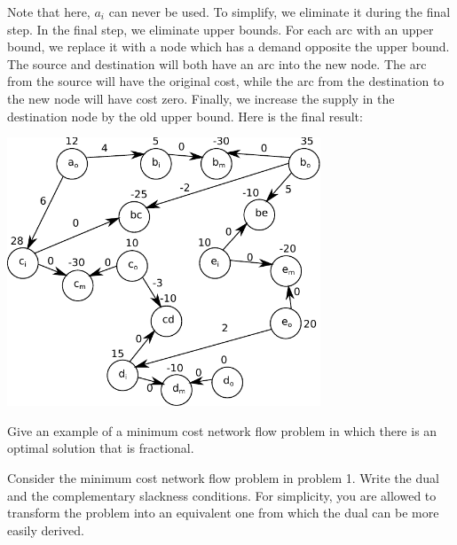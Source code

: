 \documentclass[fleqn]{homework}
\begin{document}
\begin{problem}{1}
\begin{enumerate}[a.]
      Note that here, $a_i$ can never be used.  To simplify, we eliminate it
      during the final step.  In the final step, we eliminate upper bounds.  For
      each arc with an upper bound, we replace it with a node which has a demand
      opposite the upper bound.  The source and destination will both have an
      arc into the new node.  The arc from the source will have the original
      cost, while the arc from the destination to the new node will have cost
      zero.  Finally, we increase the supply in the destination node by the old
      upper bound.  Here is the final result:

      \includegraphics[width=0.7\textwidth]{problem1-step3.pdf}
    \end{enumerate}

    
  \end{problem}

  \begin{problem}{2}
    \begin{question}
      Give an example of a minimum cost network flow problem in which there is
      an optimal solution that is fractional.
    \end{question}
  \end{problem}

  \begin{problem}{3}
    \begin{question}
      Consider the minimum cost network flow problem in problem 1.  Write the
      dual and the complementary slackness conditions.  For simplicity, you are
      allowed to transform the problem into an equivalent one from which the
      dual can be more easily derived.
    \end{question}
  \end{problem}
\end{document}
